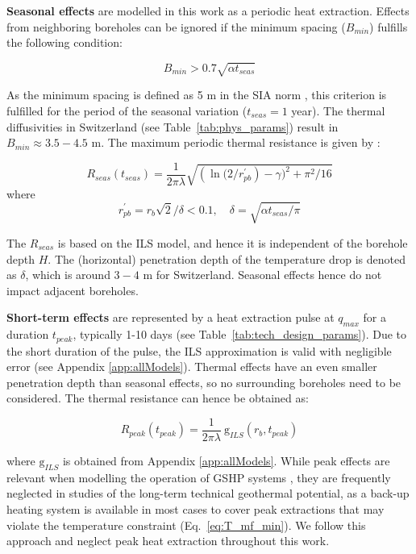 \textbf{Seasonal effects} are modelled in this work as a periodic heat extraction. Effects from neighboring boreholes can be ignored if the minimum spacing ($B_{min}$) fulfills the following condition:

\begin{equation}
    B_{min} > 0.7 \sqrt{\alpha t_{seas}}
\end{equation}

As the minimum spacing is defined as 5 m in the SIA norm \cite{sia_sondes_2010}, this criterion is fulfilled for the period of the seasonal variation ($t_{seas} = 1$ year). The thermal diffusivities in Switzerland (see Table~\ref{tab:phys_params}) result in $B_{min} \approx 3.5-4.5$ m. The maximum periodic thermal resistance is given by \citep{claesson_conductive_1988, pahud_geothermal_2002}:

\begin{equation}
    R_{seas}(t_\mathit{seas}) = \frac{1}{2 \pi \lambda} \sqrt{\left(\ln(2/r_{pb}^\prime \right) - \gamma)^2 + \pi^2/16}
\end{equation}
where
\begin{equation*}
    r_{pb}^\prime = r_b \sqrt{2}/\delta < 0.1, \quad \delta = \sqrt{ \alpha t_\mathit{seas} / \pi}
\end{equation*}

The $R_{seas}$ is based on the ILS model, and hence it is independent of the borehole depth $H$.
The (horizontal) penetration depth of the temperature drop is denoted as $\delta$, which is around $3-4$ m for Switzerland. Seasonal effects hence do not impact adjacent boreholes. 

\textbf{Short-term effects} are represented by a heat extraction pulse at $q_\mathit{max}$ for a duration $t_\mathit{peak}$, typically 1-10 days (see Table~\ref{tab:tech_design_params}). Due to the short duration of the pulse, the ILS approximation is valid with negligible error (see Appendix \ref{app:allModels}). Thermal effects have an even smaller penetration depth than seasonal effects, so no surrounding boreholes need to be considered. The thermal resistance can hence be obtained as:

\begin{equation}
    R_\mathit{peak}(t_\mathit{peak}) = \frac{1}{2 \pi \lambda} \ \mathrm{g}_{ILS}(r_b, t_\mathit{peak})
\end{equation}

where $\mathrm{g}_{ILS}$ is obtained from Appendix \ref{app:allModels}.
While peak effects are relevant when modelling the operation of GSHP systems \cite{miglani_methodology_2018}, they are frequently neglected in studies of the long-term technical geothermal potential, as a back-up heating system is available in most cases to cover peak extractions that may violate the temperature constraint (Eq.~\ref{eq:T_mf_min}). We follow this approach and neglect peak heat extraction throughout this work. 


